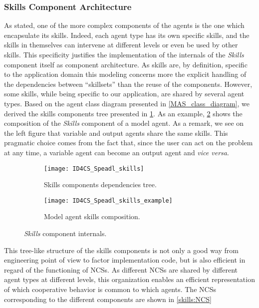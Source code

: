 \subsubsection{Skills Component Architecture}\label{Skills_component_descr}

As stated, one of the more complex components of the agents is the one which encapsulate its skills. Indeed, each agent type has its own specific skills, and the skills in themselves can intervene at different levels or even be used by other skills. This specificity justifies the implementation of the internals of the \emph{Skills} component itself as component architecture. As skills are, by definition, specific to the application domain this modeling concerns more the explicit handling of the dependencies between \enquote{skillsets} than the reuse of the components. However, some skills, while being specific to our application, are shared by several agent types. Based on the agent class diagram presented in \figurename{} \ref{MAS_class_diagram}, we derived the skills components tree presented in \figurename{} \ref{skills:graph}. As an example, \figurename{} \ref{skills:example} shows the composition of the \emph{Skills} component of a model agent. As a remark, we see on the left figure that variable and output agents share the same skills. This pragmatic choice comes from the fact that, since the user can act on the problem at any time, a variable agent can become an output agent and \emph{vice versa}.

\begin{figure}[]
\centering
	\begin{subfigure}[b]{0.49\textwidth}
			\texttt{[image: ID4CS\_Speadl\_skills]}
			\caption{Skills components dependencies tree.}\label{skills:graph}
	\end{subfigure}
	\begin{subfigure}[b]{0.49\textwidth}
			\texttt{[image: ID4CS\_Speadl\_skills\_example]}
			\caption{Model agent skills composition.}\label{skills:example}
	\end{subfigure}
\caption{\emph{Skills} component internals.}\label{skills}
\end{figure}

This tree-like structure of the skills components is not only a good way from engineering point of view to factor implementation code, but is also efficient in regard of the functioning of NCSs. As different NCSs are shared by different agent types at different levels, this organization enables an efficient representation of which cooperative behavior is common to which agents. The NCSs corresponding to the different components are shown in \figurename{} \ref{skills:NCS}

